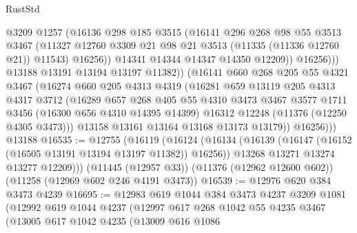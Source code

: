 \begin{lexlean}{RustStd}
\begin{coremodule}
{{{{{{{{{{{{{{{{{{{                      @3209
                      @1257
                      (@16136
                        @298
                        @185
                        @3515
                        (@16141
                          @296
                          @268
                          @98
                          @55
                          @3513
                          @3467
                          (@11327
                            @12760
                            @3309
                            @21
                            @98
                            @21
                            @3513
                            (@11335 (@11336 @12760 @21))
                            @11543)
                          @16256))
                      @14341
                      @14344
                      @14347
                      @14350
                      @12209))
                  @16256)))
            @13188
            @13191
            @13194
            @13197
            @11382))
        (@16141
          @660
          @268
          @205
          @55
          @4321
          @3467
          (@16274
            @660
            @205
            @4313
            @4319
            (@16281
              @659
              @13119
              @205
              @4313
              @4317
              @3712
              (@16289
                @657
                @268
                @405
                @55
                @4310
                @3473
                @3467
                @3577
                @1711
                @3456
                (@16300 @656 @4310 @14395 @14399)
                @16312
                @12248
                (@11376 (@12250 @4305 @3473)))
              @13158
              @13161
              @13164
              @13168
              @13173
              @13179))
          @16256)))
    @13188
@16535 := @12755
    (@16119
      (@16124
        (@16134
          (@16139 (@16147 (@16152 (@16505 @13191 @13194 @13197 @11382)) @16256))
          @13268
          @13271
          @13274
          @13277
          @12209)))
    (@11445 (@12957 @33))
    (@11376 (@12962 @12600 @602))
    (@11258 (@12969 @602 @246 @4191 @3473))
@16539 := @12976 @620 @384 @3473 @4239
@16695 := @12983
    @619
    @1044
    @384
    @3473
    @4237
    @3209
    @1081
    (@12992
      @619
      @1044
      @4237
      (@12997
        @617
        @268
        @1042
        @55
        @4235
        @3467
        (@13005
          @617
          @1042
          @4235
          (@13009
            @616
            @1086
}}}}}}}}}}}}}}}}}}}
\end{coremodule}
\end{lexlean}
